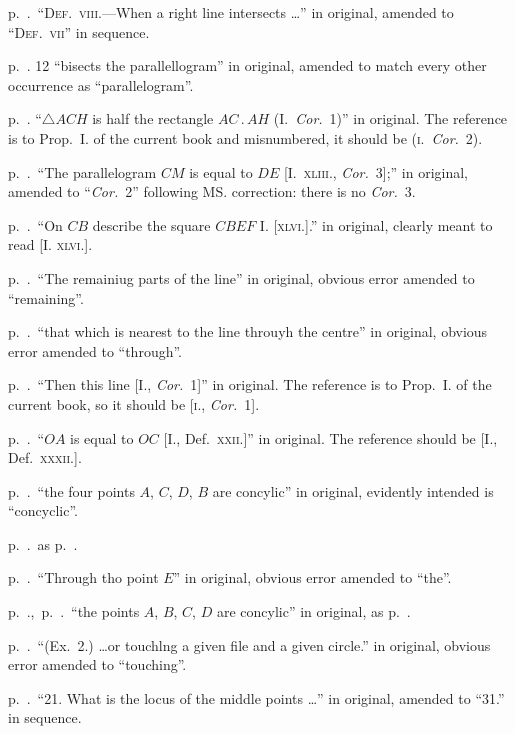\documentclass[oneside]{book}
\begin{document}
p.~\pageref{def8}.~``\textsc{Def.~viii}.---When a right line
intersects \ldots'' in original, amended to ``\textsc{Def.~vii}'' in sequence.\

p.~\pageref{parallellogram}. 12 ``bisects the parallellogram'' in original,
amended to match every other occurrence as ``parallelogram''.

p.~\pageref{1cor2}. ``$\triangle ACH$ is half the
rectangle $AC\,.\,AH$ (I.\ \textit{Cor.}\ 1)'' in original. The reference is to Prop.~I.
of the current book and misnumbered, it should be (\textsc{i}.\ \textit{Cor.}\ 2).

p.~\pageref{cor3}.~``The parallelogram $CM$
is equal to $DE$ [I.~\textsc{xliii}., \textit{Cor.}~3];'' in original, amended to ``\textit{Cor.}~2''
following MS. correction: there is no \textit{Cor.}~3.

p.~\pageref{Ixlvi}.~``On $CB$ describe the square $CBEF$ I. [\textsc{xlvi}.].'' in original,
clearly meant to read [I. \textsc{xlvi}.].

p.~\pageref{remainiug}.~``The remainiug parts of the line'' in original,
obvious error amended to ``remaining''.

p.~\pageref{throuyh}.~``that which is nearest to the line throuyh the centre'' in original,
obvious error amended to ``through''.

p.~\pageref{Icor1}.~``Then this line [I., \emph{Cor.}~1]'' in original.
The reference is to Prop.~I. of the current book, so it should be [\textsc{i.}, \emph{Cor.}~1].

p.~\pageref{Idefxxii}.~``$OA$ is equal to $OC$ [I., Def.~\textsc{xxii.}]'' in original.
The reference should be [I., Def.~\textsc{xxxii.}].

p.~\pageref{concylic1}.~``the four points $A$, $C$, $D$, $B$ are concylic'' in original,
evidently intended is ``concyclic''.

p.~\pageref{Icor1again}.~as p.~\pageref{Icor1}.

p.~\pageref{thopoint}.~``Through tho point $E$'' in original,
obvious error amended to ``the''.

p.~\pageref{concylic2}.,~p.~\pageref{concylic3}.~``the points $A$, $B$, $C$, $D$ are concylic'' in original,
as p.~\pageref{concylic1}.

p.~\pageref{concylic3}.~``(Ex.~2.) \ldots or touchlng a given file and a given circle.'' in original,
obvious error amended to ``touching''.

p.~\pageref{ex21}.~``21. What is the locus of the middle points \ldots'' in original,
amended to ``31.'' in sequence.\
\end{document}
